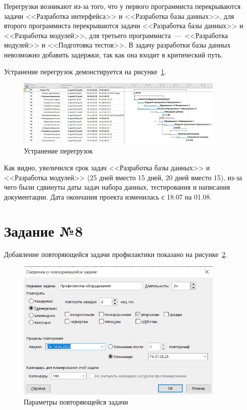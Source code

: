 Перегрузки возникают из-за того, что у первого программиста перекрываются задачи <<Разработка интерфейса>> и <<Разработка базы данных>>, для второго программиста перекрываются задачи <<Разработка базы данных>> и <<Разработка модулей>>, для третьего программиста~---~<<Разработка модулей>> и <<Подготовка тестов>>.
В задачу разработки базы данных невозможно добавить задержки, так как она входит в критический путь.

Устранение перегрузок демонстируется на рисунке~\ref{fig:screen7_3}.

\begin{figure}[H]
	\centering
	\includegraphics[width=0.9\textwidth]{img/task7/screen7_4.jpg}
	\caption{Устранение перегрузок}
	\label{fig:screen7_3}
\end{figure}

Как видно, увеличился срок задач <<Разработка базы данных>> и <<Разработка модулей>> (25 дней вместо 15 дней, 20 дней вместо 15), из-за чего были сдвинуты даты задач набора данных, тестирования и написания документации.
Дата окончания проекта изменилась с 18.07 на 01.08.

\section{Задание №8}

Добавление повторяющейся задачи профилактики показано на рисунке~\ref{fig:screen8_1}.

\begin{figure}[H]
	\centering
	\includegraphics[width=0.9\textwidth]{img/task8/screen8_1.jpg}
	\caption{Параметры повторяющейся задачи}
	\label{fig:screen8_1}
\end{figure}

